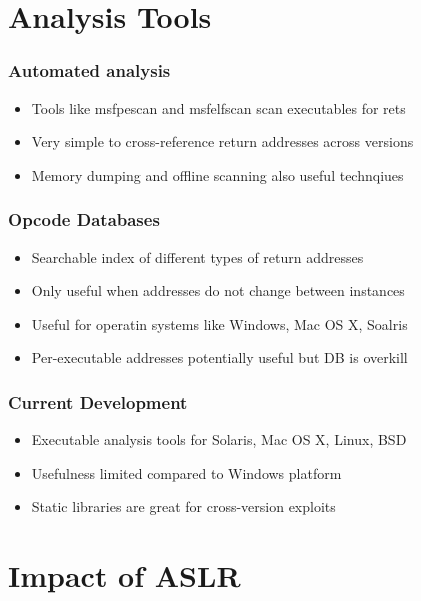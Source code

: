\documentclass{beamer}
\newenvironment{sitemize}{\vspace{1mm}\begin{itemize}\itemsep 4pt}{\end{itemize}}
\begin{document}
\section{Analysis Tools}
\begin{frame}
	\frametitle{Automated analysis}
	\begin{sitemize}
		\item Tools like msfpescan and msfelfscan scan executables for rets
		\item Very simple to cross-reference return addresses across versions
		\item Memory dumping and offline scanning also useful technqiues
	\end{sitemize}	
\end{frame}

\begin{frame}
	\frametitle{Opcode Databases}
	\begin{sitemize}
		\item Searchable index of different types of return addresses
		\item Only useful when addresses do not change between instances
		\item Useful for operatin systems like Windows, Mac OS X, Soalris
		\item Per-executable addresses potentially useful but DB is overkill
	\end{sitemize}	
\end{frame}

\begin{frame}
	\frametitle{Current Development}
	\begin{sitemize}
		\item Executable analysis tools for Solaris, Mac OS X, Linux, BSD
		\item Usefulness limited compared to Windows platform
		\item Static libraries are great for cross-version exploits
	\end{sitemize}	
\end{frame}

\section{Impact of ASLR}
\end{document}
